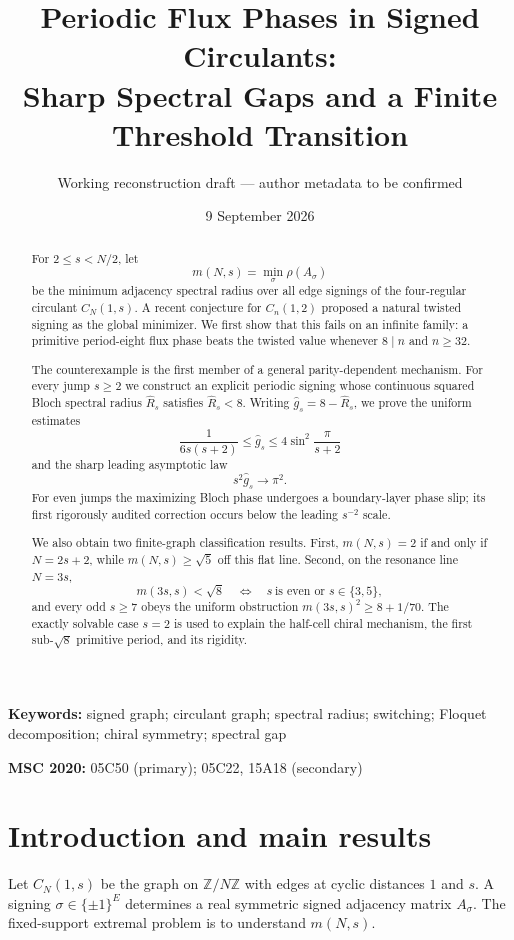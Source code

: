 \documentclass[11pt]{article}
\title{Periodic Flux Phases in Signed Circulants:\\Sharp Spectral Gaps and a Finite Threshold Transition}
\author{Working reconstruction draft --- author metadata to be confirmed}
\date{9 September 2026}
\theoremstyle{remark}
\newcommand{\Z}{\mathbb Z}
\begin{document}
\maketitle

\begin{abstract}
For $2\le s<N/2$, let
\[
 m(N,s)=\min_{\sigma}\rho(A_\sigma)
\]
be the minimum adjacency spectral radius over all edge signings of the
four-regular circulant $C_N(1,s)$.  A recent conjecture for $C_n(1,2)$
proposed a natural twisted signing as the global minimizer.  We first show
that this fails on an infinite family: a primitive period-eight flux phase
beats the twisted value whenever $8\mid n$ and $n\ge32$.

The counterexample is the first member of a general parity-dependent
mechanism.  For every jump $s\ge2$ we construct an explicit periodic signing
whose continuous squared Bloch spectral radius $\widehat R_s$ satisfies
$\widehat R_s<8$.  Writing $\widehat g_s=8-\widehat R_s$, we prove the
uniform estimates
\[
 \frac{1}{6s(s+2)}\le \widehat g_s
 \le 4\sin^2\!\frac{\pi}{s+2}
\]
and the sharp leading asymptotic law
\[
 s^2\widehat g_s\longrightarrow\pi^2.
\]
For even jumps the maximizing Bloch phase undergoes a boundary-layer phase
slip; its first rigorously audited correction occurs below the leading
$s^{-2}$ scale.

We also obtain two finite-graph classification results.  First,
$m(N,s)=2$ if and only if $N=2s+2$, while $m(N,s)\ge\sqrt5$ off this flat
line.  Second, on the resonance line $N=3s$,
\[
 m(3s,s)<\sqrt8
 \quad\Longleftrightarrow\quad
 s\ \text{is even or }s\in\{3,5\},
\]
and every odd $s\ge7$ obeys the uniform obstruction
$m(3s,s)^2\ge8+1/70$.  The exactly solvable case $s=2$ is used to explain
the half-cell chiral mechanism, the first sub-$\sqrt8$ primitive period, and
its rigidity.
\end{abstract}

\noindent\textbf{Keywords:} signed graph; circulant graph; spectral radius;
switching; Floquet decomposition; chiral symmetry; spectral gap

\medskip
\noindent\textbf{MSC 2020:} 05C50 (primary); 05C22, 15A18 (secondary)

\section{Introduction and main results}

Let $C_N(1,s)$ be the graph on $\Z/N\Z$ with edges at cyclic distances $1$
and $s$.  A signing $\sigma\in\{\pm1\}^{E}$ determines a real symmetric
signed adjacency matrix $A_\sigma$.  The fixed-support extremal problem is to
understand $m(N,s)$.
\end{document}
